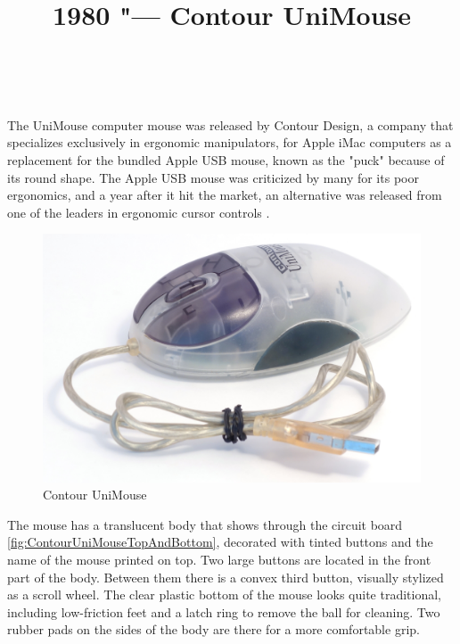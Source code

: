\documentclass[11pt, a4paper]{article}
\begin{document}
\title{1980 "--- Contour UniMouse}
\date{}
\author{~}
\maketitle
{}

The UniMouse computer mouse was released by Contour Design, a company that specializes exclusively in ergonomic manipulators, for Apple iMac computers as a replacement for the bundled Apple USB mouse, known as the "puck" because of its round shape. The Apple USB mouse was criticized by many for its poor ergonomics, and a year after it hit the market, an alternative was released from one of the leaders in ergonomic cursor controls \cite{pressrelease}.

\begin{figure}[h]
   \centering
    \includegraphics[scale=0.53]{1999_contour_unimouse/pic_30.jpg}
    \caption{Contour UniMouse}
    \label{fig:ContourUniMousePic}
\end{figure}

The mouse has a translucent body that shows through the circuit board \ref{fig:ContourUniMouseTopAndBottom}, decorated with tinted buttons and the name of the mouse printed on top. Two large buttons are located in the front part of the body. Between them there is a convex third button, visually stylized as a scroll wheel. The clear plastic bottom of the mouse looks quite traditional, including low-friction feet and a latch ring to remove the ball for cleaning. Two rubber pads on the sides of the body are there for a more comfortable grip.
\end{document}
